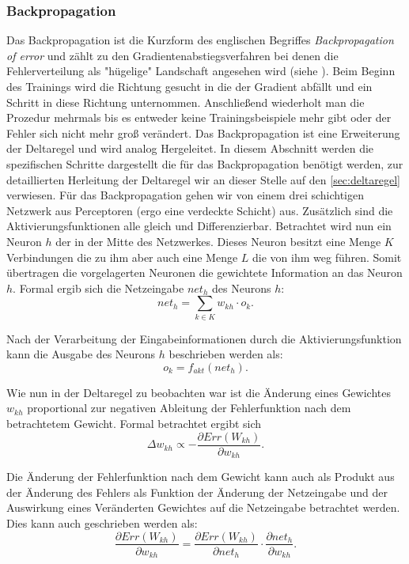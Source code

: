 \subsubsection{Backpropagation}\label{sec:Backpropagation}
Das Backpropagation ist die Kurzform des englischen Begriffes \textit{Backpropagation of error} und zählt zu den Gradientenabstiegsverfahren bei denen die Fehlerverteilung als "hügelige" Landschaft angesehen wird (siehe ). Beim Beginn des Trainings wird die Richtung gesucht in die der Gradient abfällt und ein Schritt in diese Richtung unternommen. Anschließend wiederholt man die Prozedur mehrmals bis es entweder keine Trainingsbeispiele mehr gibt oder der Fehler sich nicht mehr groß verändert. Das Backpropagation ist eine Erweiterung der Deltaregel und wird analog Hergeleitet. In diesem Abschnitt werden die spezifischen Schritte dargestellt die für das Backpropagation benötigt werden, zur detaillierten Herleitung der Deltaregel wir an dieser Stelle auf den \autoref{sec:deltaregel} verwiesen.
Für das Backpropagation gehen wir von einem drei schichtigen Netzwerk aus Perceptoren (ergo eine verdeckte Schicht) aus. Zusätzlich sind die Aktivierungsfunktionen alle gleich und Differenzierbar.
Betrachtet wird nun ein Neuron $h$ der in der Mitte des Netzwerkes. Dieses Neuron besitzt eine Menge $K$ Verbindungen die zu ihm aber auch eine Menge $L$ die von ihm weg führen. Somit übertragen die vorgelagerten Neuronen die gewichtete Information an das Neuron $h$. Formal ergib sich die Netzeingabe $net_{h}$ des Neurons $h$:
\begin{equation}
net_{h} = \sum_{k \in K} w_{kh} \cdot o_{k} .
\label{gl:neth}
\end{equation}

Nach der Verarbeitung der Eingabeinformationen durch die Aktivierungsfunktion kann die Ausgabe des Neurons $h$ beschrieben werden als:
\begin{equation}
o_{k}= f_{akt}(net_{h}) .
\label{gl:aktiv}
\end{equation}

Wie nun in der Deltaregel zu beobachten war ist die Änderung eines Gewichtes $w_{kh}$ proportional zur negativen Ableitung der Fehlerfunktion nach dem betrachtetem Gewicht. Formal betrachtet ergibt sich
\begin{equation*}
\Delta w_{kh} \propto -  \frac{\partial Err(W_{kh})}{\partial w_{kh}}.
\end{equation*}

Die Änderung der Fehlerfunktion nach dem Gewicht kann auch als Produkt aus der Änderung des Fehlers als Funktion der Änderung der Netzeingabe und der Auswirkung eines Veränderten Gewichtes auf die Netzeingabe betrachtet werden. Dies kann auch geschrieben werden als:
\begin{equation}
\frac{\partial Err(W_{kh})}{\partial w_{kh}} = \frac{\partial Err(W_{kh})}{\partial net_{h}} \cdot \frac{\partial net_{h}}{\partial w_{kh}}.
\label{gl:zerlket2}
\end{equation}

